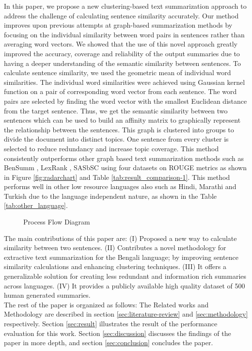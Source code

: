 In this paper, we propose a new clustering-based text summarization approach to address the challenge of calculating sentence similarity accurately. Our method improves upon previous attempts at graph-based summarization methods \cite{chowdhury-etal-2021-tfidf-clustering, roychowdhury-etal-2022-spectral-base} by focusing on the individual similarity between word pairs in sentences rather than averaging word vectors. We showed that the use of this novel approach greatly improved the accuracy, coverage and reliability of the output summaries due to having a deeper understanding of the semantic similarity between sentences. To calculate sentence similarity, we used the geometric mean of individual word similarities. The individual word similarities were achieved using Gaussian kernel function on a pair of corresponding word vector from each sentence. The word pairs are selected by finding the word vector with the smallest Euclidean distance from the target sentence. Thus, we get the semantic similarity between two sentences which can be used to build an affinity matrix to graphically represent the relationship between the sentences. This graph is clustered into groups to divide the document into distinct topics. One sentence from every cluster is selected to reduce redundancy and increase topic coverage. This method consistently outperforms other graph based text summarization methods such as BenSumm \cite{chowdhury-etal-2021-tfidf-clustering}, LexRank \cite{Erkan-lexRank-2004}, SASbSC \cite{roychowdhury-etal-2022-spectral-base} using four datasets on ROUGE metrics \cite{lin-2004-rouge} as shown in Figure \ref{fig:radarchart} and Table \ref{tab:result_comparison-1}. This method performs well in other low resource languages also such as Hindi, Marathi and Turkish due to the language independent nature, as shown in the Table \ref{tab:other_language}.\\

\begin{figure}
    \centering
    
    \caption{Process Flow Diagram}
    \label{fig:process-flow-diagram}
\end{figure}
The main contributions of this paper are:
(I) Proposed a new way to calculate similarity between two sentences.
(II) Contributes a novel methodology for extractive text summarization for the Bengali language; by improving sentence similarity calculations and enhancing clustering techniques.
(III) It offers a generalizable solution for creating less redundant and information rich summaries across languages.
(IV) It provides a publicly available high quality dataset of 500 human generated summaries.\\

The rest of the paper is organized as follows: The Related works and Methodology are described in section \ref{sec:literature-review} and \ref{sec:methodology} respectively. Section \ref{sec:result} illustrates the result of the performance evaluation for this work. Section \ref{sec:discussion} discusses the findings of the paper in more depth, and section \ref{sec:conclusion} concludes the paper.